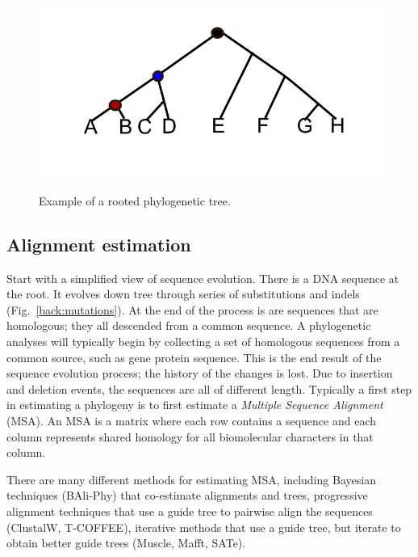 \begin{figure}[htpb]
\begin{center}
{\includegraphics[scale=0.8]{background/phylogeny.pdf}}
\end{center}
\caption[A rooted phylogenetic tree.]{\label{back:phylo_tree} Example of a rooted phylogenetic tree.}
\end{figure}



\subsection{Alignment estimation}\label{back:alignment}

Start with a simplified view of sequence evolution.  There is a DNA sequence at the root.  It evolves down tree through series of substitutions and indels (Fig.~\ref{back:mutations}).  At the end of the process is are sequences that are homologous; they all descended from a common sequence.  A phylogenetic analyses will typically begin by collecting a set of homologous sequences from a common source, such as gene protein sequence.  This is the end result of the sequence evolution process; the history of the changes is lost.  Due to insertion and deletion events, the sequences are all of different length.  Typically a first step in estimating a phylogeny is to first estimate a \emph{Multiple Sequence Alignment} (MSA).  An MSA is a matrix where each row contains a sequence and each column represents shared homology for all biomolecular characters in that column.  

There are many different methods for estimating MSA, including Bayesian techniques (BAli-Phy) that co-estimate alignments and trees, progressive alignment techniques that use a guide tree to pairwise align the sequences (ClustalW, T-COFFEE), iterative methods that use a guide tree, but iterate to obtain better guide trees (Muscle, Mafft, SATe).  

